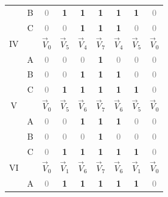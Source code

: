 \documentclass[11pt]{report}
\begin{document}
\begin{table}[htbp]
\begin{tabular}{c c c c c c c c c }
                          & B & \textcolor{gray}{0}         & \textbf{1}         & \textbf{1}         & \textbf{1}         & \textbf{1}         & \textbf{1}         & \textcolor{gray}{0}         \\
                          & C & \textcolor{gray}{0}         & \textcolor{gray}{0}         & \textbf{1}         & \textbf{1}         & \textbf{1}         & \textcolor{gray}{0}         & \textcolor{gray}{0}         \\
        \hline
        IV                &   & $\vec{V}_0$ & $\vec{V}_5$ & $\vec{V}_4$ & $\vec{V}_7$ & $\vec{V}_4$ & $\vec{V}_5$ & $\vec{V}_0$ \\
                          & A & \textcolor{gray}{0}         & \textcolor{gray}{0}         & \textcolor{gray}{0}         & \textbf{1}         & \textcolor{gray}{0}         & \textcolor{gray}{0}         & \textcolor{gray}{0}         \\
                          & B & \textcolor{gray}{0}         & \textcolor{gray}{0}         & \textbf{1}         & \textbf{1}         & \textbf{1}         & \textcolor{gray}{0}         & \textcolor{gray}{0}         \\
                          & C & \textcolor{gray}{0}         & \textbf{1}         & \textbf{1}         & \textbf{1}         & \textbf{1}         & \textbf{1}         & \textcolor{gray}{0}         \\
        \hline
        V                 &   & $\vec{V}_0$ & $\vec{V}_5$ & $\vec{V}_6$ & $\vec{V}_7$ & $\vec{V}_6$ & $\vec{V}_5$ & $\vec{V}_0$ \\
                          & A & \textcolor{gray}{0}         & \textcolor{gray}{0}         & \textbf{1}         & \textbf{1}         & \textbf{1}         & \textcolor{gray}{0}         & \textcolor{gray}{0}         \\
                          & B & \textcolor{gray}{0}         & \textcolor{gray}{0}         & \textcolor{gray}{0}         & \textbf{1}         & \textcolor{gray}{0}         & \textcolor{gray}{0}         & \textcolor{gray}{0}         \\
                          & C & \textcolor{gray}{0}         & \textbf{1}         & \textbf{1}         & \textbf{1}         & \textbf{1}         & \textbf{1}         & \textcolor{gray}{0}         \\
        \hline
        VI                &   & $\vec{V}_0$ & $\vec{V}_1$ & $\vec{V}_6$ & $\vec{V}_7$ & $\vec{V}_6$ & $\vec{V}_1$ & $\vec{V}_0$ \\
                          & A & \textcolor{gray}{0}         & \textbf{1}         & \textbf{1}         & \textbf{1}         & \textbf{1}         & \textbf{1}         & \textcolor{gray}{0}         \\

\end{tabular}
\end{table}
\end{document}
